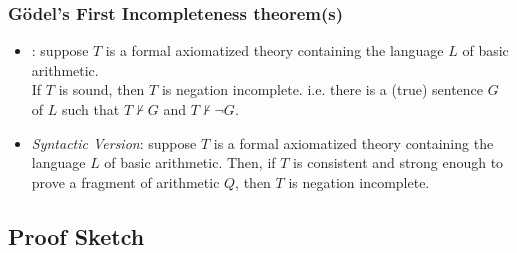 \fi %





\begin{frame}
\frametitle{G\"odel's First Incompleteness theorem(s)}

\begin{itemize}[<+->]

\item {}: suppose $T$ is a formal axiomatized theory containing the language $L$ of basic arithmetic. \\ If $T$ is \textcolor{OGlyallpink}{sound}, then $T$ is negation incomplete. i.e. there is a (\textcolor{OGlyallpink}{true}) sentence $G$ of $L$ such that $T \nvdash G$ and $T \nvdash \neg G$. 

\item \emph{Syntactic Version}: suppose $T$ is a formal axiomatized theory containing the language $L$ of basic arithmetic. Then, if $T$ is \textcolor{highlightA}{consistent} and \textcolor{highlightA}{strong enough to prove} a fragment of arithmetic $Q$, then $T$ is negation incomplete.



\end{itemize}
\end{frame}

\subsection{Proof Sketch} 


